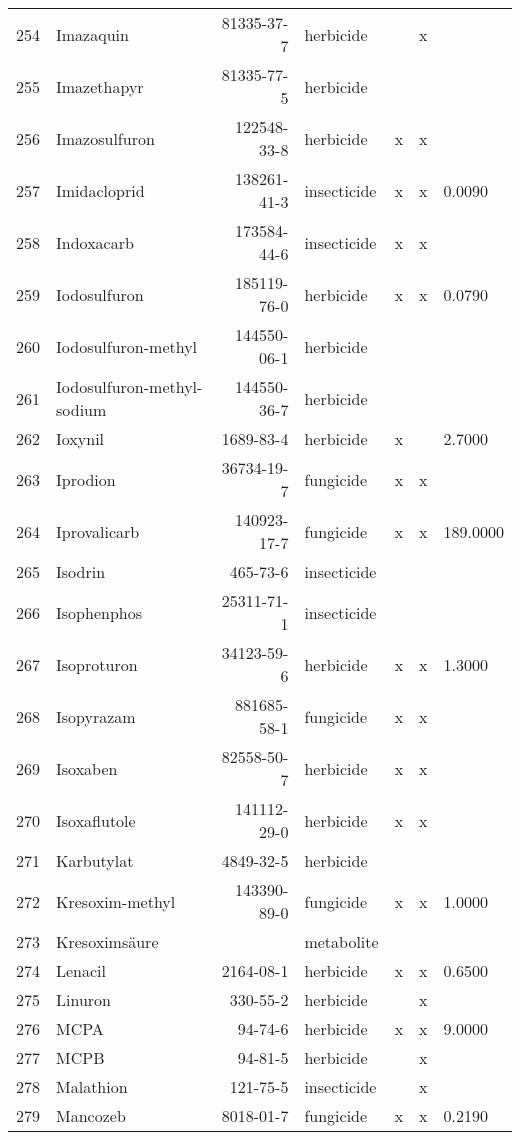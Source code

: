 \begin{longtable}{lp{4cm}rlp{1.3cm}p{1.3cm}p{1.5cm}}
  254 & Imazaquin & 81335-37-7 & herbicide &  & x &  \\ 
  255 & Imazethapyr & 81335-77-5 & herbicide &  &  &  \\ 
  256 & Imazosulfuron & 122548-33-8 & herbicide & x & x &  \\ 
  257 & Imidacloprid & 138261-41-3 & insecticide & x & x & 0.0090 \\ 
  258 & Indoxacarb & 173584-44-6 & insecticide & x & x &  \\ 
  259 & Iodosulfuron & 185119-76-0 & herbicide & x & x & 0.0790 \\ 
  260 & Iodosulfuron-methyl & 144550-06-1 & herbicide &  &  &  \\ 
  261 & Iodosulfuron-methyl-sodium & 144550-36-7 & herbicide &  &  &  \\ 
  262 & Ioxynil & 1689-83-4 & herbicide & x &  & 2.7000 \\ 
  263 & Iprodion & 36734-19-7 & fungicide & x & x &  \\ 
  264 & Iprovalicarb & 140923-17-7 & fungicide & x & x & 189.0000 \\ 
  265 & Isodrin & 465-73-6 & insecticide &  &  &  \\ 
  266 & Isophenphos & 25311-71-1 & insecticide &  &  &  \\ 
  267 & Isoproturon & 34123-59-6 & herbicide & x & x & 1.3000 \\ 
  268 & Isopyrazam & 881685-58-1 & fungicide & x & x &  \\ 
  269 & Isoxaben & 82558-50-7 & herbicide & x & x &  \\ 
  270 & Isoxaflutole & 141112-29-0 & herbicide & x & x &  \\ 
  271 & Karbutylat & 4849-32-5 & herbicide &  &  &  \\ 
  272 & Kresoxim-methyl & 143390-89-0 & fungicide & x & x & 1.0000 \\ 
  273 & Kresoximsäure &  & metabolite &  &  &  \\ 
  274 & Lenacil & 2164-08-1 & herbicide & x & x & 0.6500 \\ 
  275 & Linuron & 330-55-2 & herbicide &  & x &  \\ 
  276 & MCPA & 94-74-6 & herbicide & x & x & 9.0000 \\ 
  277 & MCPB & 94-81-5 & herbicide &  & x &  \\ 
  278 & Malathion & 121-75-5 & insecticide &  & x &  \\ 
  279 & Mancozeb & 8018-01-7 & fungicide & x & x & 0.2190 \\ 

\end{longtable}
